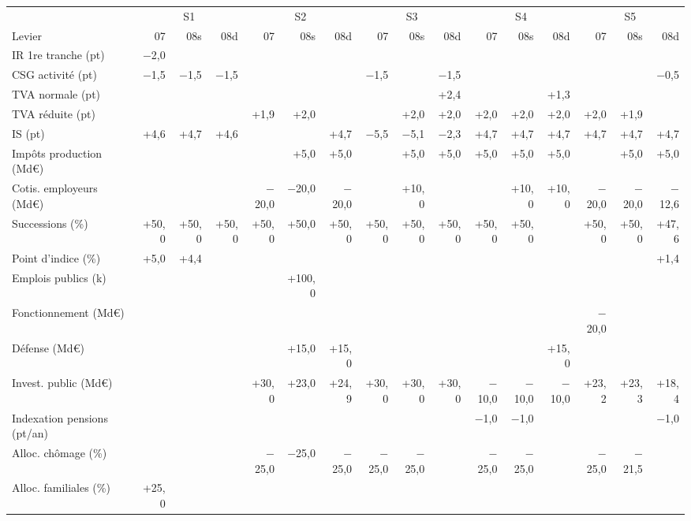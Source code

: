 \begin{tabular}{lrrrrrrrrrrrrrrr}\toprule
 & \multicolumn{3}{c}{S1} & \multicolumn{3}{c}{S2} & \multicolumn{3}{c}{S3} & \multicolumn{3}{c}{S4} & \multicolumn{3}{c}{S5} \\
Levier & 07 & 08s & 08d & 07 & 08s & 08d & 07 & 08s & 08d & 07 & 08s & 08d & 07 & 08s & 08d \\ \midrule
IR 1re tranche (pt) & $-$2,0 &  &  &  &  &  &  &  &  &  &  &  &  &  &  \\
CSG activité (pt) & $-$1,5 & $-$1,5 & $-$1,5 &  &  &  & $-$1,5 &  & $-$1,5 &  &  &  &  &  & $-$0,5 \\
TVA normale (pt) &  &  &  &  &  &  &  &  & +2,4 &  &  & +1,3 &  &  &  \\
TVA réduite (pt) &  &  &  & +1,9 & +2,0 &  &  & +2,0 & +2,0 & +2,0 & +2,0 & +2,0 & +2,0 & +1,9 &  \\
IS (pt) & +4,6 & +4,7 & +4,6 &  &  & +4,7 & $-$5,5 & $-$5,1 & $-$2,3 & +4,7 & +4,7 & +4,7 & +4,7 & +4,7 & +4,7 \\
Impôts production (Md€) &  &  &  &  & +5,0 & +5,0 &  & +5,0 & +5,0 & +5,0 & +5,0 & +5,0 &  & +5,0 & +5,0 \\
Cotis. employeurs (Md€) &  &  &  & $-$20,0 & $-$20,0 & $-$20,0 &  & +10,0 &  &  & +10,0 & +10,0 & $-$20,0 & $-$20,0 & $-$12,6 \\
Successions (\%) & +50,0 & +50,0 & +50,0 & +50,0 & +50,0 & +50,0 & +50,0 & +50,0 & +50,0 & +50,0 & +50,0 &  & +50,0 & +50,0 & +47,6 \\
Point d'indice (\%) & +5,0 & +4,4 &  &  &  &  &  &  &  &  &  &  &  &  & +1,4 \\
Emplois publics (k) &  &  &  &  & +100,0 &  &  &  &  &  &  &  &  &  &  \\
Fonctionnement (Md€) &  &  &  &  &  &  &  &  &  &  &  &  & $-$20,0 &  &  \\
Défense (Md€) &  &  &  &  & +15,0 & +15,0 &  &  &  &  &  & +15,0 &  &  &  \\
Invest. public (Md€) &  &  &  & +30,0 & +23,0 & +24,9 & +30,0 & +30,0 & +30,0 & $-$10,0 & $-$10,0 & $-$10,0 & +23,2 & +23,3 & +18,4 \\
Indexation pensions (pt/an) &  &  &  &  &  &  &  &  &  & $-$1,0 & $-$1,0 &  &  &  & $-$1,0 \\
Alloc. chômage (\%) &  &  &  & $-$25,0 & $-$25,0 & $-$25,0 & $-$25,0 & $-$25,0 &  & $-$25,0 & $-$25,0 &  & $-$25,0 & $-$21,5 &  \\
Alloc. familiales (\%) & +25,0 &  &  &  &  &  &  &  &  &  &  &  &  &  &  \\

\end{tabular}
